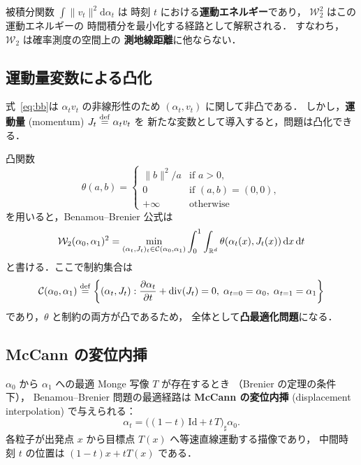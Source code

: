 被積分関数 $\int \|v_t\|^2 \mathrm{d}\alpha_t$ は
時刻 $t$ における\textbf{運動エネルギー}であり，
$\mathcal{W}_2^2$ はこの運動エネルギーの
時間積分を最小化する経路として解釈される．
すなわち，$\mathcal{W}_2$ は確率測度の空間上の
\textbf{測地線距離}に他ならない．

\subsection{運動量変数による凸化}\label{subsec:momentum}

式~\eqref{eq:bb}は $\alpha_t v_t$ の非線形性のため
$(\alpha_t, v_t)$ に関して非凸である．
しかし，\textbf{運動量} (momentum) $J_t \overset{\mathrm{def}}{=} \alpha_t v_t$ を
新たな変数として導入すると，問題は凸化できる．

凸関数
\[
  \theta(a, b) =
  \begin{cases}
    \|b\|^2 / a & \text{if } a > 0, \\
    0 & \text{if } (a, b) = (0, 0), \\
    +\infty & \text{otherwise}
  \end{cases}
\]
を用いると，Benamou--Brenier 公式は
\begin{equation}\label{eq:bb-convex}
  \mathcal{W}_2(\alpha_0, \alpha_1)^2
  = \min_{(\alpha_t, J_t)_t \in \mathcal{C}(\alpha_0, \alpha_1)}
  \int_0^1 \int_{\mathbb{R}^d} \theta(\alpha_t(x), J_t(x))\, \mathrm{d}x\, \mathrm{d}t
\end{equation}
と書ける．ここで制約集合は
\[
  \mathcal{C}(\alpha_0, \alpha_1) \overset{\mathrm{def}}{=}
  \left\{(\alpha_t, J_t) :
  \frac{\partial \alpha_t}{\partial t} + \mathrm{div}(J_t) = 0,\;
  \alpha_{t=0} = \alpha_0,\; \alpha_{t=1} = \alpha_1
  \right\}
\]
であり，$\theta$ と制約の両方が凸であるため，
全体として\textbf{凸最適化問題}になる．

\subsection{McCann の変位内挿}\label{subsec:mccann}

$\alpha_0$ から $\alpha_1$ への最適 Monge 写像 $T$ が存在するとき
（Brenier の定理の条件下），
Benamou--Brenier 問題の最適経路は
\textbf{McCann の変位内挿} (displacement interpolation) で与えられる：
\begin{equation}\label{eq:mccann}
  \alpha_t = \bigl((1-t)\, \mathrm{Id} + t\, T\bigr)_\sharp \alpha_0.
\end{equation}
各粒子が出発点 $x$ から目標点 $T(x)$ へ等速直線運動する描像であり，
中間時刻 $t$ の位置は $(1-t)x + t T(x)$ である．



